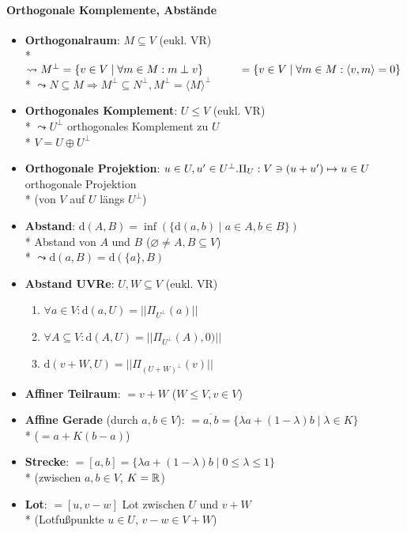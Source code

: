 \paragraph{Orthogonale Komplemente, Abstände}
\begin{itemize}
	\item \textbf{Orthogonalraum}: \( M \subseteq V \) (eukl. VR) \\* \( \leadsto M^\perp = \{ v \in V \mid \forall m \in M: m \perp v \} \\* \phantom{xx  x xx\ } = \{ v \in V \mid \forall m \in M: \langle v,m \rangle = 0 \} \) 
		\\*
		\( \leadsto N \subseteq M \Rightarrow M^\perp \subseteq N^\perp, M^\perp = \langle M \rangle^\perp \)
	\item \textbf{Orthogonales Komplement}: \( U \leq V \) (eukl. VR) \\* \( \leadsto U^\perp \) orthogonales Komplement zu \( U \) \\* \( V = U \oplus U^\perp \)
	\item \textbf{Orthogonale Projektion}: \( u \in U, u' \in U^\perp. \\* \Pi_U: V \ni (u+u') \mapsto u \in U \) orthogonale Projektion \\* (von \( V \) auf \( U \) längs \( U^\perp \))
	\item \textbf{Abstand}: \( \text{d}(A,B) = \inf(\{ \text{d}(a,b) \mid a \in A, b \in B \}) \)
		\\*
		Abstand von \( A \) und \( B \) (\( \varnothing \neq A,B \subseteq V \))
		\\*
		\( \leadsto \text{d}(a,B) = \text{d}(\{ a \}, B) \)
	\item \textbf{Abstand UVRe}: \( U,W \subseteq V \) (eukl. VR)
		\begin{enumerate}
			\item \( \forall a \in V: \text{d}(a,U) = || \Pi_{U^\perp}(a) || \)
			\item \( \forall A \subseteq V: \text{d}(A,U) = || \Pi_{U^\perp}(A),0) || \)
			\item \( \text{d}(v+W, U) = || \Pi_{(U+W)^\perp}(v) || \)
		\end{enumerate}

	\item \textbf{Affiner Teilraum}: \( = v+W \) (\( W \leq V, v \in V \))
	\item \textbf{Affine Gerade} (durch \( a,b \in V \)): \( = \overline{a,b} = \{ \lambda a + (1-\lambda)b \mid \lambda \in K \} \) \\* (\( = a + K(b-a) \))
	\item \textbf{Strecke}: \( = [a,b] = \{ \lambda a + (1 - \lambda)b \mid 0 \leq \lambda \leq 1 \} \) \\* (zwischen \( a,b \in V \), \( K = \mathbb{R} \))
	\item \textbf{Lot}: \( = [u,v-w] \) Lot zwischen \( U \) und \( v+W \) \\* (Lotfußpunkte \( u \in U \), \( v-w \in V+W \))
\end{itemize}